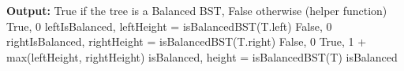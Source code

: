 \documentclass[10pt]{article}
\begin{document}
\begin{solution}
\begin{enumerate}[(a)]
\begin{algorithm}
\begin{algorithmic}[1]
            \Statex \textbf{Output:} True if the tree is a Balanced BST, False otherwise
             (helper function)
                    \State \Return True, 0
                \EndIf
                \State  leftIsBalanced, leftHeight = isBalancedBST(T.left)
                    \State \Return False, 0
                \EndIf
                \State rightIsBalanced, rightHeight = isBalancedBST(T.right)
                    \State \Return False, 0
                \EndIf
                \State \Return True, 1 + max(leftHeight, rightHeight)
            \EndFunction
                \State isBalanced, height = isBalancedBST(T)
                \State \Return isBalanced
            \EndFunction
            \end{algorithmic}
        \end{algorithm}
    \end{enumerate}
\end{solution}
\end{document}
